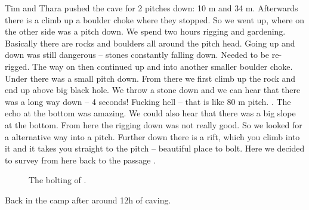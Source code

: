 Tim and Thara pushed the cave for 2 pitches down: 10 m and 34 m.
Afterwards there is a climb up a boulder choke where they stopped. So we
went up, where on the other side was a pitch down. We spend two hours
rigging and gardening. Basically there are rocks and boulders all around
the pitch head. Going up and down was still dangerous -- stones
constantly falling down. Needed to be re-rigged. The way on then
continued up and into another smaller boulder choke. Under there was a
small pitch down. From there we first climb up the rock and end up above
big black hole. We throw a stone down and we can hear that there was a
long way down -- 4 seconds! Fucking hell -- that is like 80 m pitch.
. The echo at the bottom was
amazing. We could also hear that there was a big slope at the bottom.
From here the rigging down was not really good. So we looked for a
alternative way into a pitch. Further down there is a rift, which you
climb into it and it takes you straight to the pitch -- beautiful place
to bolt. Here we decided to survey from here back to the passage .


\begin{figure}
\checkoddpage \ifoddpage \forcerectofloat \else \forceversofloat \fi
{}
\caption{The bolting of . }
\label{walk the line cartoon}
\end{figure}


Back in the camp after around 12h of caving.

